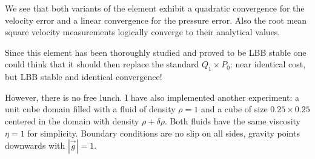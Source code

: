 We see that both variants of the element exhibit a quadratic convergence for the
velocity error and a linear convergence for the pressure error. Also the root mean square 
velocity measurements logically converge to their analytical values.  

Since this element has been thoroughly studied and proved to be LBB stable one could think that it 
should then replace the standard $Q_1 \times P_0$: near identical cost, but LBB stable and 
identical convergence!

However, there is no free lunch. I have also implemented another experiment: a unit cube domain
filled with a fluid of density $\rho=1$ and a cube of size $0.25\times 0.25$ centered in the domain
with density $\rho+\delta \rho$. Both fluids have the same viscosity $\eta=1$ for simplicity.
Boundary conditions are no slip on all sides, gravity points downwards with $|\vec{g}|=1$.

